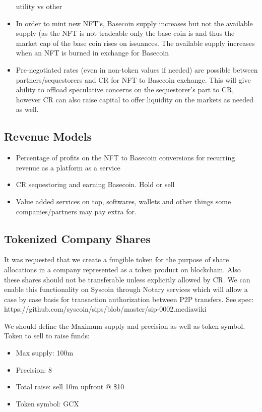 \documentclass{article}
\begin{document}
\begin{itemize}
utility vs other
\item In order to mint new NFT’s, Basecoin supply increases but not the available supply (as
the NFT is not tradeable only the base coin is and thus the market cap of the base coin rises on issuances. The available supply increases when an NFT is burned in exchange
for Basecoin
\item Pre-negotiated rates (even in non-token values if needed) are possible between
partners/sequestorers and CR for NFT to Basecoin exchange. This will give ability to
offload speculative concerns on the sequestorer's part to CR, however CR can also raise
capital to offer liquidity on the markets as needed as well.
\end{itemize}

\subsection{Revenue Models}

\begin{itemize}
\item Percentage of profits on the NFT to Basecoin conversions for recurring revenue as a
platform as a service
\item CR sequestoring and earning Basecoin. Hold or sell
\item Value added services on top, softwares, wallets and other things some
companies/partners may pay extra for.
\end{itemize}

\subsection{Tokenized Company Shares}

It was requested that we create a fungible token for the purpose of share allocations in a
company represented as a token product on blockchain. Also these shares should not be
transferable unless explicitly allowed by CR. We can enable this functionality on Syscoin
through Notary services which will allow a case by case basis for transaction authorization
between P2P transfers. See spec:
https://github.com/syscoin/sips/blob/master/sip-0002.mediawiki

We should define the Maximum supply and precision as well as token symbol.
Token to sell to raise funds:
\begin{itemize}
\item Max supply: 100m
\item Precision: 8
\item Total raise: sell 10m upfront @ \$10
\item Token symbol: GCX
\end{itemize}
\end{document}
